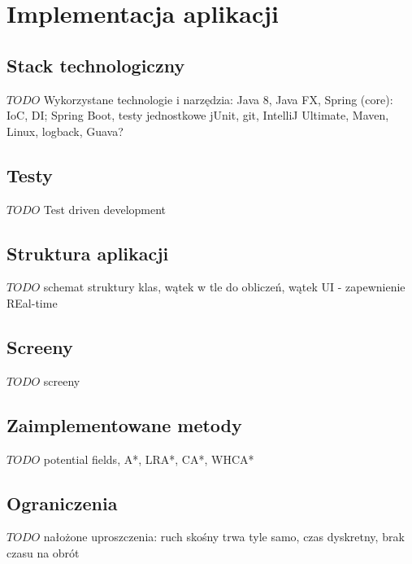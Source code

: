 \chapter{Implementacja aplikacji}
\label{ch:implementation}

\section{Stack technologiczny}
$TODO$ Wykorzystane technologie i narzędzia: Java 8, Java FX, Spring (core): IoC, DI; Spring Boot, testy jednostkowe jUnit, git, IntelliJ Ultimate, Maven, Linux, logback, Guava?

\section{Testy}
$TODO$ Test driven development

\section{Struktura aplikacji}
$TODO$ schemat struktury klas, wątek w tle do obliczeń, wątek UI - zapewnienie REal-time

\section{Screeny}
$TODO$ screeny

\section{Zaimplementowane metody}
$TODO$ potential fields, A*, LRA*, CA*, WHCA*

\section{Ograniczenia}
$TODO$ nałożone uproszczenia: ruch skośny trwa tyle samo, czas dyskretny, brak czasu na obrót
